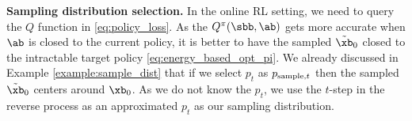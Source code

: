 \textbf{Sampling distribution selection.} In the online RL setting, we need to query the $Q$ function in \eqref{eq:policy_loss}. As the $Q^\pi(\sbb,\ab)$ gets more accurate when $\ab$ is closed to the current policy, it is better to have the sampled $\tilde\xb_0$ closed to the intractable target policy \eqref{eq:energy_based_opt_pi}. We already discussed in Example \ref{example:sample_dist} that if we select $p_t$ as $p_{{\rm sample}, t}$ then the sampled $\tilde\xb_0$ centers around $\xb_0$. As we do not know the $p_t$, we use the $t$-step in the reverse process as an approximated $p_t$ as our sampling distribution.


